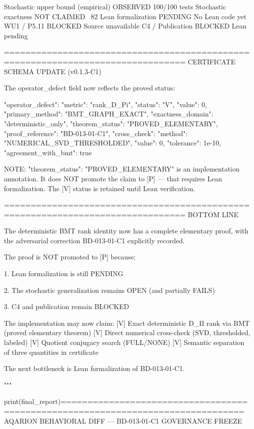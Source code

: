 Stochastic upper bound (empirical)            OBSERVED      100/100 tests
Stochastic exactness                          NOT CLAIMED   ~82%
Lean formalization                            PENDING       No Lean code yet
WU1 / P5.11                                   BLOCKED       Source unavailable
C4 / Publication                              BLOCKED       Lean pending

================================================================================
CERTIFICATE SCHEMA UPDATE (v0.1.3-C1)

The operator_defect field now reflects the proved status:

{
"operator_defect": {
"metric": "rank_D_Pi",
"status": "V",
"value": 0,
"primary_method": "BMT_GRAPH_EXACT",
"exactness_domain": "deterministic_only",
"theorem_status": "PROVED_ELEMENTARY",
"proof_reference": "BD-013-01-C1",
"cross_check": {
"method": "NUMERICAL_SVD_THRESHOLDED",
"value": 0,
"tolerance": 1e-10,
"agreement_with_bmt": true
}
}
}

NOTE: "theorem_status": "PROVED_ELEMENTARY" is an implementation annotation.
It does NOT promote the claim to [P] — that requires Lean formalization.
The [V] status is retained until Lean verification.

================================================================================
BOTTOM LINE

The deterministic BMT rank identity now has a complete elementary proof,
with the adversarial correction BD-013-01-C1 explicitly recorded.

The proof is NOT promoted to [P] because:

1. Lean formalization is still PENDING


2. The stochastic generalization remains OPEN (and partially FAILS)


3. C4 and publication remain BLOCKED



The implementation may now claim:
[V] Exact deterministic D_Π rank via BMT (proved elementary theorem)
[V] Direct numerical cross-check (SVD, thresholded, labeled)
[V] Quotient conjugacy search (FULL/NONE)
[V] Semantic separation of three quantities in certificate

The next bottleneck is Lean formalization of BD-013-01-C1.

"""

print(final_report)================================================================================
AQARION BEHAVIORAL DIFF — BD-013-01-C1 GOVERNANCE FREEZE

